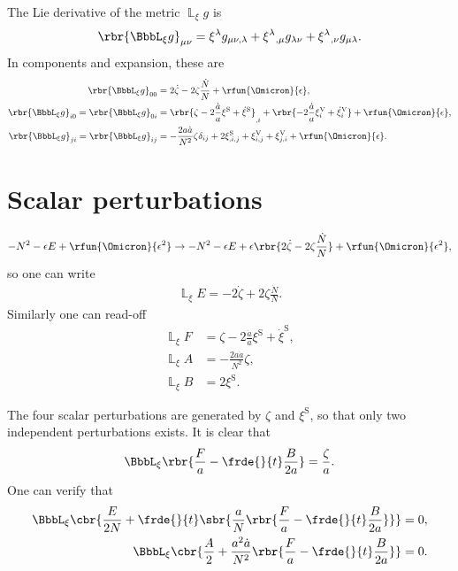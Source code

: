 \documentclass[a4paper,11pt]{article}
\begin{document}
The Lie derivative of the metric $\BbbL_{\xi} g$ is
\begin{align}
\rbr{\BbbL_{\xi} g}_{\mu\nu} =
\xi^\lambda g_{\mu\nu,\lambda} + 
\xi^{\lambda}{}_{,\mu} g_{\lambda\nu} +
\xi^{\lambda}{}_{,\nu} g_{\mu\lambda}.
\end{align}
In components and expansion, these are
\begin{align}
\rbr{\BbbL_{\xi} g}_{00} &=
2\dot\zeta - 2\zeta \frac{\dot{N}}{N} + \rfun{\Omicron}{\epsilon}, \\
\rbr{\BbbL_{\xi} g}_{i0} = \rbr{\BbbL_{\xi} g}_{0i} &=
\rbr{\zeta-2\frac{\dot{a}}{a}\xi^\text{S}+\dot{\xi}^\text{S}}_{,i} +
\rbr{-2\frac{\dot{a}}{a}\xi^\text{V}_{i}+\dot{\xi}^\text{V}_{i}}
+ \rfun{\Omicron}{\epsilon}, \\
\rbr{\BbbL_{\xi} g}_{ji} = \rbr{\BbbL_{\xi} g}_{ij} &=
-\frac{2a\dot{a}}{N^2} \zeta \delta_{ij} + 2\xi^\text{S}_{,i,j}
+ \xi^\text{V}_{i,j} + \xi^\text{V}_{j,i} + \rfun{\Omicron}{\epsilon}.
\end{align}

\section{Scalar perturbations}



\begin{align}
-N^2 - \epsilon E + \rfun{\Omicron}{\epsilon^2} \to
-N^2 - \epsilon E + \epsilon\rbr{2\dot\zeta - 2\zeta\frac{\dot{N}}{N}}
+ \rfun{\Omicron}{\epsilon^2},
\end{align}
so one can write
\begin{align}
\BbbL_\xi E = -2 \dot{\zeta} + 2 \zeta \frac{\dot{N}}{N}.
\end{align}
Similarly one can read-off
\begin{align}
\BbbL_\xi F &= \zeta - 2\frac{\dot{a}}{a}\xi^\text{S} + \dot{\xi}^\text{S}, \\
\BbbL_\xi A &= -\frac{2a\dot{a}}{N^2}\zeta, \\
\BbbL_\xi B &= 2\xi^\text{S}.
\end{align}

The four scalar perturbations are generated by $\zeta$ and $\xi^\text{S}$, so 
that only two independent perturbations exists. It is clear that
\begin{align}
\BbbL_\xi\rbr{\frac{F}{a}-\frde{}{t}\frac{B}{2a}} = \frac{\zeta}{a}.
\end{align}
One can verify that
\begin{align}
\BbbL_\xi\cbr{\frac{E}{2N}+
\frde{}{t}\sbr{\frac{a}{N}\rbr{\frac{F}{a}-\frde{}{t}\frac{B}{2a}}}} &= 0, \\
\BbbL_\xi\cbr{\frac{A}{2}+
\frac{a^2 \dot{a}}{N^2}\rbr{\frac{F}{a}-\frde{}{t}\frac{B}{2a}}} &= 0.
\end{align}
\end{document}
